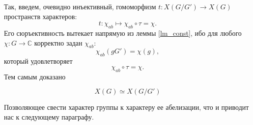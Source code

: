    Так, введем, очевидно инъективный, гомоморфизм 
    $t: X(G/G') \to X(G)$ пространств характеров:
    \begin{equation}
        t : \chi_{ab} \mapsto \chi_{ab} \circ \tau = \chi. 
    \end{equation}
    Его сюръективность вытекает напрямую из леммы \ref{lm_const}, ибо для 
    любого $\chi : G \to \mathbb{C}$ корректно задан $\chi_{ab}$:
    \[\chi_{ab}(gG') = \chi(g),\]
    который удовлетворяет 
    \[\chi_{ab} \circ \tau = \chi.\]
    Тем самым доказано
    \begin{statement}\label{st_char_gr_to_ab}
        \[X(G) \simeq X(G/G')\]
    \end{statement}
    Позволяющее свести характер группы к характеру ее абелизации, что и 
    приводит нас к следующему параграфу.
    